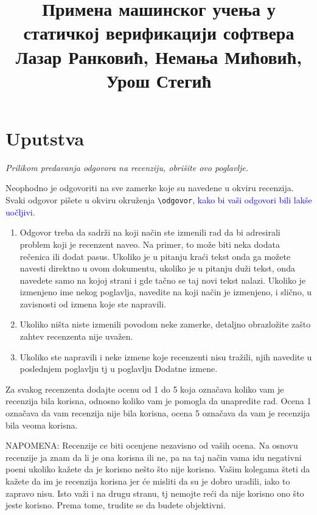 \documentclass[a4paper]{report}
\newcommand{\odgovor}[1]{\textcolor{blue}{#1}}
\begin{document}
\title{Примена машинског учења у статичкој верификацији софтвера\\ \small{Лазар Ранковић, Немања Мићовић, Урош Стегић}}

\maketitle

\tableofcontents

\chapter{Uputstva}
\emph{Prilikom predavanja odgovora na recenziju, obrišite ovo poglavlje.}

Neophodno je odgovoriti na sve zamerke koje su navedene u okviru recenzija. Svaki odgovor pišete u okviru okruženja \verb"\odgovor", \odgovor{kako bi vaši odgovori bili lakše uočljivi.} 
\begin{enumerate}

\item Odgovor treba da sadrži na koji način ste izmenili rad da bi adresirali problem koji je recenzent naveo. Na primer, to može biti neka dodata rečenica ili dodat pasus. Ukoliko je u pitanju kraći tekst onda ga možete navesti direktno u ovom dokumentu, ukoliko je u pitanju duži tekst, onda navedete samo na kojoj strani i gde tačno se taj novi tekst nalazi. Ukoliko je izmenjeno ime nekog poglavlja, navedite na koji način je izmenjeno, i slično, u zavisnosti od izmena koje ste napravili. 

\item Ukoliko ništa niste izmenili povodom neke zamerke, detaljno obrazložite zašto zahtev recenzenta nije uvažen.

\item Ukoliko ste napravili i neke izmene koje recenzenti nisu tražili, njih navedite u poslednjem poglavlju tj u poglavlju Dodatne izmene.
\end{enumerate}

Za svakog recenzenta dodajte ocenu od 1 do 5 koja označava koliko vam je recenzija bila korisna, odnosno koliko vam je pomogla da unapredite rad. Ocena 1 označava da vam recenzija nije bila korisna, ocena 5 označava da vam je recenzija bila veoma korisna. 

NAPOMENA: Recenzije ce biti ocenjene nezavisno od vaših ocena. Na osnovu recenzije ja znam da li je ona korisna ili ne, pa na taj način vama idu negativni poeni ukoliko kažete da je korisno nešto što nije korisno. Vašim kolegama šteti da kažete da im je recenzija korisna jer će misliti da su je dobro uradili, iako to zapravo nisu. Isto važi i na drugu stranu, tj nemojte reći da nije korisno ono što jeste korisno. Prema tome, trudite se da budete objektivni. 
\end{document}
